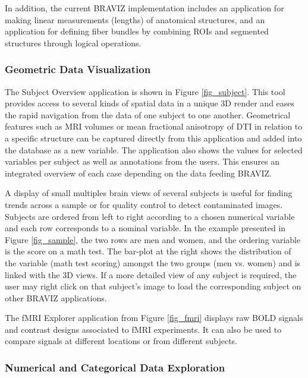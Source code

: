 \documentclass[twocolumn]{svjour3}
\begin{document}
In addition, the current BRAVIZ implementation includes an application for making linear measurements (lengths) of anatomical structures, and an application for defining fiber bundles by combining ROIs and segmented structures through logical operations.


\subsubsection{Geometric Data Visualization}

The Subject Overview application is shown in Figure \ref{fig_subject}. This tool  provides access to several kinds of spatial data in a unique 3D render and eases the rapid navigation from the data of one subject to one another. Geometrical features such as MRI volumes or mean fractional anisotropy of DTI in relation to a specific structure can be captured directly from this application and added into the database as a new variable. The application also shows the values for selected variables per subject as well as annotations from the users. This ensures an integrated overview of each case depending on the data feeding BRAVIZ.

A display of small multiples \cite{tufte_visual_1983}  brain views  of several subjects is useful for finding trends across a sample or for quality control to detect contaminated images. Subjects are ordered from left to right according to a chosen numerical variable and each row corresponds to a nominal variable. In the example presented in Figure \ref{fig_sample}, the two rows are men and women, and the ordering variable is the score on a math test. The bar-plot at the right shows the distribution of the variable (math test scoring) amongst the two groups (men vs. women) and is linked with the 3D views. If a more detailed view of any subject is required, the user may right click on that subject’s image to load the corresponding subject on other BRAVIZ applications.

The fMRI Explorer application from Figure \ref{fig_fmri} displays raw BOLD signals and contrast designs associated to fMRI experiments. It can also be used to compare signals at different locations or from different subjects.

\subsubsection{Numerical and Categorical Data Exploration}
\end{document}
